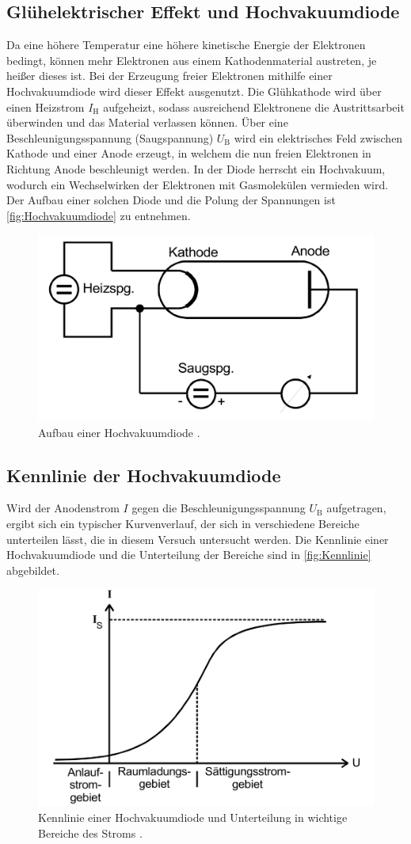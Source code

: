 \subsection{Glühelektrischer Effekt und Hochvakuumdiode}
\label{subsec:Glueelek}
Da eine höhere Temperatur eine höhere kinetische Energie der Elektronen bedingt, können mehr Elektronen aus einem Kathodenmaterial austreten, je heißer dieses ist.
Bei der Erzeugung freier Elektronen mithilfe einer Hochvakuumdiode wird dieser Effekt ausgenutzt. Die Glühkathode wird über einen Heizstrom $I_\text{H}$ aufgeheizt,
sodass ausreichend Elektronene die Austrittsarbeit überwinden und das Material verlassen können. Über eine Beschleunigungsspannung (Saugspannung) $U_\text{B}$
wird ein elektrisches Feld zwischen Kathode und einer Anode erzeugt, in welchem die nun freien Elektronen in Richtung Anode beschleunigt werden. 
In der Diode herrscht ein Hochvakuum, wodurch ein Wechselwirken der Elektronen mit Gasmolekülen vermieden wird.
Der Aufbau einer solchen Diode und die Polung der Spannungen ist \autoref{fig:Hochvakuumdiode} zu entnehmen.
\begin{figure}
    \centering
    \includegraphics[width = .5\textwidth]{content/Vakuumdiode.png}
    \caption{Aufbau einer Hochvakuumdiode \cite{v504}.}
    \label{fig:Hochvakuumdiode}
\end{figure}

\subsection{Kennlinie der Hochvakuumdiode}
\label{subsec:T_Kennlinie}
Wird der Anodenstrom $I$ gegen die Beschleunigungsspannung $U_\text{B}$ aufgetragen, ergibt sich ein typischer Kurvenverlauf, der sich in verschiedene Bereiche 
unterteilen lässt, die in diesem Versuch untersucht werden. Die Kennlinie einer Hochvakuumdiode und die Unterteilung der Bereiche sind in \autoref{fig:Kennlinie} abgebildet.

\begin{figure}
    \centering
    \includegraphics[width = .5\textwidth]{content/Kennlinie.png}
    \caption{Kennlinie einer Hochvakuumdiode und Unterteilung in wichtige Bereiche des Stroms \cite{v504}.}
    \label{fig:Kennlinie}
\end{figure}

